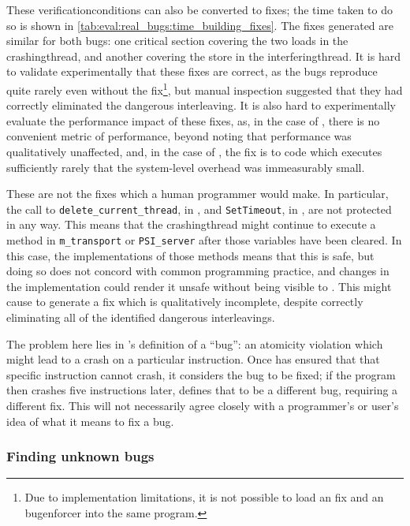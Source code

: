 \noindent
These \glspl{verificationcondition} can also be converted to fixes;
the time taken to do so is shown in
\autoref{tab:eval:real_bugs:time_building_fixes}.  The fixes generated
are similar for both bugs: one critical section covering the two loads
in the \gls{crashingthread}, and another covering the store in the
\gls{interferingthread}.  It is hard to
validate experimentally that these fixes are correct, as the bugs
reproduce quite rarely even without the fix\footnote{Due to
  implementation limitations, it is not possible to load an
  {\technique} fix and an {\technique} \gls{bugenforcer} into the same
  program.}\!\!, but manual inspection suggested that they had correctly
eliminated the dangerous interleaving.  It is also hard to
experimentally evaluate the performance impact of these fixes, as, in
the case of , there is no convenient metric of
performance, beyond noting that performance was qualitatively
unaffected, and, in the case of , the fix is to code
which executes sufficiently rarely that the system-level overhead was
immeasurably small.

These are not the fixes which a human programmer would make.  In
particular, the call to \texttt{delete\_current\_thread}, in
, and \texttt{SetTimeout}, in ,
are not protected in any way.  This means that the
\gls{crashingthread} might continue to execute a method in
\texttt{m\_transport} or \texttt{PSI\_server} after those variables
have been cleared.  In this case, the implementations of those methods
means that this is safe, but doing so does not concord with common
programming practice, and changes in the implementation could render
it unsafe without being visible to {\technique}.  This might cause
{\technique} to generate a fix which is qualitatively incomplete,
despite correctly eliminating all of the identified dangerous
interleavings.

The problem here lies in {\technique}'s definition of a ``bug'': an
atomicity violation which might lead to a crash on a particular
instruction.  Once {\technique} has ensured that that specific
instruction cannot crash, it considers the bug to be fixed; if the
program then crashes five instructions later, {\technique} defines
that to be a different bug, requiring a different fix.  This will not
necessarily agree closely with a programmer's or user's idea of what
it means to fix a bug.

\subsubsection{Finding unknown bugs}
\label{sect:how:finding_unknown}

